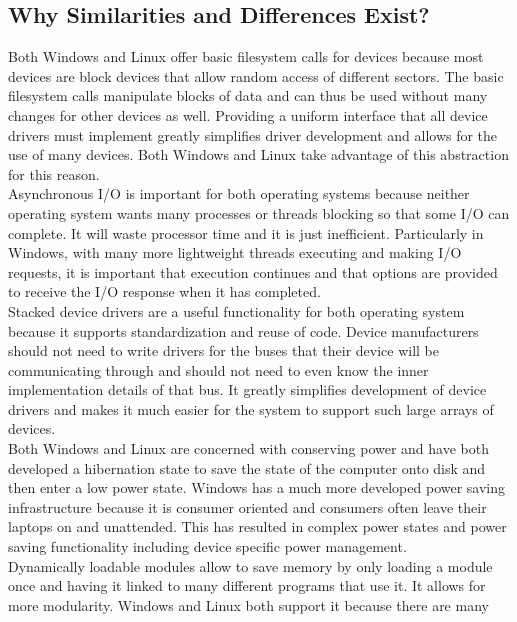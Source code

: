 \documentclass[letterpaper,10pt,titlepage]{article}
\begin{document}
\subsection{Why Similarities and Differences Exist?}
Both Windows and Linux offer basic filesystem calls for devices because most 
devices are block devices that allow random access of different sectors. 
The basic filesystem calls manipulate blocks of data and can thus be used 
without many changes for other devices as well. Providing a uniform interface
that all device drivers must implement greatly simplifies driver development
and allows for the use of many devices. Both Windows and Linux take advantage
of this abstraction for this reason. 
\\
\linebreak
Asynchronous I/O is important for both operating systems because neither 
operating system wants many processes or threads blocking so that some I/O 
can complete. It will waste processor time and it is just inefficient. 
Particularly in Windows, with many more lightweight threads executing and 
making I/O requests, it is important that execution continues and that 
options are provided to receive the I/O response when it has completed.
\\
\linebreak
Stacked device drivers are a useful functionality for both operating system 
because it supports standardization and reuse of code. Device manufacturers
should not need to write drivers for the buses that their device will be 
communicating through and should not need to even know the inner 
implementation details of that bus. It greatly simplifies development of 
device drivers and makes it much easier for the system to support such large
arrays of devices.
\\
\linebreak
Both Windows and Linux are concerned with conserving power and have both 
developed a hibernation state to save the state of the computer onto disk and
then enter a low power state. Windows has a much more developed power saving
infrastructure because it is consumer oriented and consumers often leave 
their laptops on and unattended. This has resulted in complex power states 
and power saving functionality including device specific power 
management.
\\
\linebreak
Dynamically loadable modules allow to save memory by only loading a module 
once and having it linked to many different programs that use it. It allows
for more modularity. Windows and Linux both support it because there are many
\end{document}
